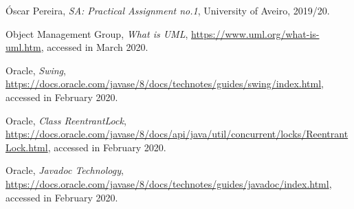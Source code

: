 \documentclass[12pt]{article}
\begin{document}
\begin{thebibliography}{9} %
  

    Óscar Pereira,
    \textit{SA: Practical Assignment no.1},
    University of Aveiro,
    2019/20.

    Object Management Group,
    \textit{What is UML},
    \url{https://www.uml.org/what-is-uml.htm},
    accessed in March 2020.

    Oracle,
    \textit{Swing},
    \url{https://docs.oracle.com/javase/8/docs/technotes/guides/swing/index.html},
    accessed in February 2020.

    Oracle,
    \textit{Class ReentrantLock},
    \url{https://docs.oracle.com/javase/8/docs/api/java/util/concurrent/locks/ReentrantLock.html},
    accessed in February 2020.
    
    Oracle,
    \textit{Javadoc Technology},
    \url{https://docs.oracle.com/javase/8/docs/technotes/guides/javadoc/index.html},
    accessed in February 2020.

\end{thebibliography}

\clearpage
\end{document}

